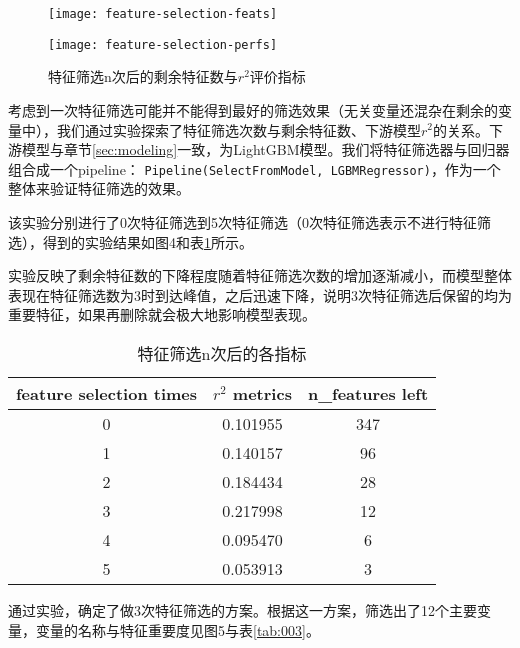 \documentclass[bwprint]{gmcmthesis}
\begin{document}
\begin{figure}[htb]
	\centering
	\begin{minipage}[c]{0.4\textwidth}
		\centering
		\texttt{[image: feature-selection-feats]}
	\end{minipage}
	\begin{minipage}[c]{0.4\textheight}
		\centering
		\texttt{[image: feature-selection-perfs]}
	\end{minipage}
	\caption{特征筛选n次后的剩余特征数与$r^2$评价指标}
\end{figure}

考虑到一次特征筛选可能并不能得到最好的筛选效果（无关变量还混杂在剩余的变量中），我们通过实验探索了特征筛选次数与剩余特征数、下游模型$r^2$的关系。下游模型与章节\ref{sec:modeling}一致，为LightGBM模型。我们将特征筛选器与回归器组合成一个pipeline： \texttt{Pipeline(SelectFromModel, LGBMRegressor)}，作为一个整体来验证特征筛选的效果。

该实验分别进行了0次特征筛选到5次特征筛选（0次特征筛选表示不进行特征筛选），得到的实验结果如图4和表\ref{tab:002}所示。

实验反映了剩余特征数的下降程度随着特征筛选次数的增加逐渐减小，而模型整体表现在特征筛选数为3时到达峰值，之后迅速下降，说明3次特征筛选后保留的均为重要特征，如果再删除就会极大地影响模型表现。

\begin{table}[!htbp]
	\caption{特征筛选n次后的各指标}\label{tab:002} \centering
	\begin{tabular}{ccc}
		\toprule[1.5pt]
	feature selection times &  $r^2$ metrics &  n\_features left \\
		\midrule[1pt]
           0 &       0.101955 &              347 \\
			1 &       0.140157 &               96 \\
			2 &       0.184434 &               28 \\
			3 &       0.217998 &               12 \\
			4 &       0.095470 &                6 \\
			5 &       0.053913 &                3 \\
		\bottomrule[1.5pt]
	\end{tabular}
\end{table}

通过实验，确定了做3次特征筛选的方案。根据这一方案，筛选出了12个主要变量，变量的名称与特征重要度见图5与表\ref{tab:003}。
\end{document}
